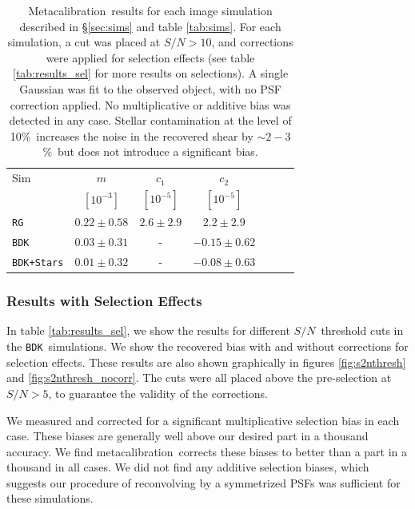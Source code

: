 \documentclass[a4paper,fleqn,usenatbib]{mnras}
\newcommand{\snr}{$S/N$}
\newcommand{\mcal}{metacalibration}
\newcommand{\Mcal}{Metacalibration}
\newcommand{\nsimNstarperc}{10\%}
\newcommand{\starnoiseincrease}{$\sim 2-3$\%}
\newcommand{\bdsim}{\texttt{BDK}}
\newcommand{\bdstar}{\texttt{BDK+Stars}}
\newcommand{\bdmask}{\texttt{Mask}}
\newcommand{\rgsim}{\texttt{RG}}
\begin{document}
\begin{table}
    \centering
    \caption{\Mcal\ results for each image simulation described in
        \S \ref{sec:sims} and table \ref{tab:sims}.  For each simulation,
        a cut was placed at \snr$ > 10$, and corrections were applied
        for selection effects (see table \ref{tab:results_sel} for more
        results on selections).  A single Gaussian was fit
    to the observed object, with no PSF correction applied.
    No multiplicative or additive bias was detected in any case. 
    Stellar contamination at the level of \nsimNstarperc\ increases
    the noise in the recovered shear by \starnoiseincrease\ but does not introduce 
    a significant bias.  
    \label{tab:results}}
    \begin{tabular}{ |l|  c|c|c|  c|c|c|}
        \hline
        Sim    & $m$               & $c_1$            & $c_2$ \\
               & $[10^{-3}]$       & $[10^{-5}]$      & $[10^{-5}]$ \\
        \hline
        \rgsim & $0.22 \pm 0.58$  & $2.6 \pm 2.9$    & $2.2 \pm 2.9$ \\
        \bdsim & $0.03 \pm 0.31$  & -                & $-0.15 \pm 0.62$ \\
        \bdstar& $0.01 \pm 0.32$  & -                & $-0.08 \pm 0.63$
    \end{tabular}
\end{table}



\subsubsection{Results with Selection Effects}

In table \ref{tab:results_sel}, we show the results for different \snr\
threshold cuts in the \bdsim\ simulations.  We show the recovered bias with and
without corrections for selection effects.  These results are also shown
graphically in figures \ref{fig:s2nthresh} and \ref{fig:s2nthresh_nocorr}.  The
cuts were all placed above the pre-selection at \snr$ > 5$, to guarantee the
validity of the corrections.

We measured and corrected for a significant multiplicative selection bias in
each case.  These biases are generally well above our desired part in a
thousand accuracy.  We find \mcal\ corrects these biases to better than a part
in a thousand in all cases.  We did not find any additive selection biases,
which suggests our procedure of reconvolving by a symmetrized PSFs was
sufficient for these simulations.
\end{document}
